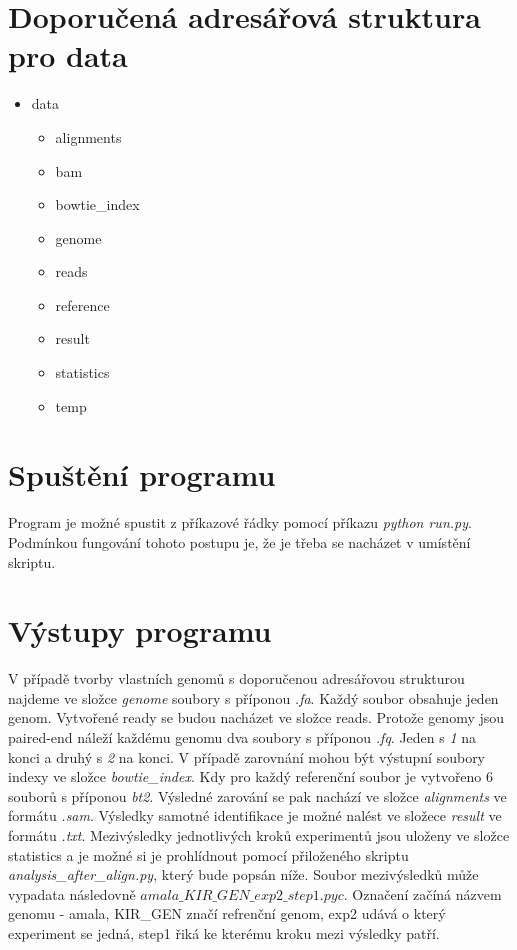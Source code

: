 \documentclass[czech,DP]{thesiskiv}
\numberwithin{equation}{section}
\begin{document}
\section{Doporučená adresářová struktura pro data}
\begin{itemize}
	\item data
		\begin{itemize}
			\item alignments
			\item bam
			\item bowtie\_index
			\item genome
			\item reads
			\item reference			
			\item result
			\item statistics 
			\item temp
		\end{itemize}
\end{itemize}

\section{Spuštění programu}
Program je možné spustit z příkazové řádky pomocí příkazu \textit {python run.py}. Podmínkou fungování tohoto postupu je, že je třeba se nacházet v umístění skriptu. 

\section{Výstupy programu}
V případě tvorby vlastních genomů s doporučenou adresářovou strukturou najdeme ve složce \textit{genome} soubory s příponou \textit{.fa}. Každý soubor obsahuje jeden genom.
Vytvořené ready se budou nacházet ve složce reads. Protože genomy jsou paired-end náleží každému genomu dva soubory s příponou \textit{.fq}. Jeden s \textit{1} na konci a druhý s \textit{2} na konci. 
V případě zarovnání mohou být výstupní soubory indexy ve složce \textit{bowtie\_index}. Kdy pro každý referenční soubor je vytvořeno 6 souborů s příponou \textit{bt2}. Výsledné zarování se pak nachází ve složce \textit{alignments} ve formátu \textit{.sam}. Výsledky samotné identifikace je možné nalést ve složece \textit{result} ve formátu \textit{.txt}. Mezivýsledky jednotlivých kroků experimentů jsou uloženy ve složce statistics a je možné si je prohlídnout pomocí přiloženého skriptu \textit{analysis\_after\_align.py}, který bude popsán níže. Soubor mezivýsledků může vypadata následovně $amala\_KIR\_GEN\_exp2\_step1.pyc$.  Označení začíná názvem genomu - amala, KIR\_GEN značí refrenční genom, exp2 udává o který experiment se jedná, step1 řiká ke kterému kroku mezi výsledky patří. 
\end{document}
